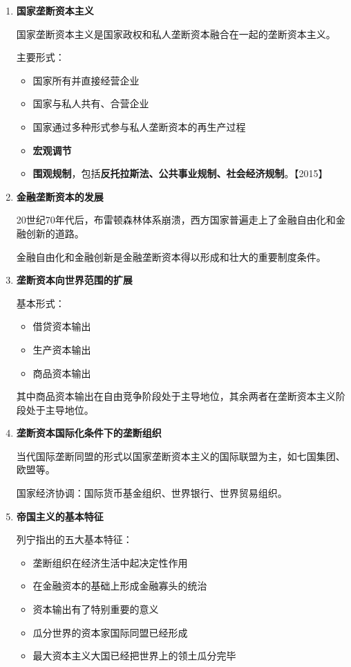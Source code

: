 \documentclass[12pt, a4paper, oneside]{ctexart}
\begin{document}
\begin{enumerate}
  \item {\bf 国家垄断资本主义}
  
  国家垄断资本主义是国家政权和私人垄断资本融合在一起的垄断资本主义。

  主要形式：
  \begin{itemize}
    \item 国家所有并直接经营企业
    \item 国家与私人共有、合营企业
    \item 国家通过多种形式参与私人垄断资本的再生产过程
    \item {\bf 宏观调节}
    \item {\bf 围观规制}，包括\textbf{反托拉斯法、公共事业规制、社会经济规制}。【2015】
  \end{itemize}

  \item {\bf 金融垄断资本的发展}
  
  20世纪70年代后，布雷顿森林体系崩溃，西方国家普遍走上了金融自由化和金融创新的道路。

  金融自由化和金融创新是金融垄断资本得以形成和壮大的重要制度条件。

  \item {\bf 垄断资本向世界范围的扩展}
  
  基本形式：
  \begin{itemize}
    \item 借贷资本输出
    \item 生产资本输出
    \item 商品资本输出
  \end{itemize}

  其中商品资本输出在自由竞争阶段处于主导地位，其余两者在垄断资本主义阶段处于主导地位。

  \item {\bf 垄断资本国际化条件下的垄断组织}
  
  当代国际垄断同盟的形式以国家垄断资本主义的国际联盟为主，如七国集团、欧盟等。

  国家经济协调：国际货币基金组织、世界银行、世界贸易组织。

  \item {\bf 帝国主义的基本特征}
  
  列宁指出的五大基本特征：
  \begin{itemize}
    \item 垄断组织在经济生活中起决定性作用
    \item 在金融资本的基础上形成金融寡头的统治
    \item 资本输出有了特别重要的意义
    \item 瓜分世界的资本家国际同盟已经形成
    \item 最大资本主义大国已经把世界上的领土瓜分完毕
  \end{itemize}
\end{enumerate}
\end{document}
